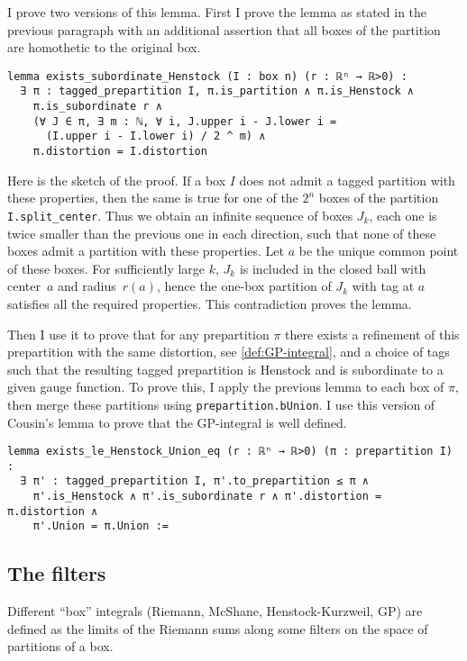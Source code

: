 \documentclass[a4paper, UKenglish,cleveref, autoref, thm-restate]{lipics-v2021}
\begin{document}
I prove two versions of this lemma. First I prove the lemma as stated
in the previous paragraph with an additional assertion that all boxes
of the partition are homothetic to the original box.

\begin{lstlisting}
lemma exists_subordinate_Henstock (I : box n) (r : ℝⁿ → ℝ>0) :
  ∃ π : tagged_prepartition I, π.is_partition ∧ π.is_Henstock ∧
    π.is_subordinate r ∧
    (∀ J ∈ π, ∃ m : ℕ, ∀ i, J.upper i - J.lower i =
      (I.upper i - I.lower i) / 2 ^ m) ∧
    π.distortion = I.distortion
\end{lstlisting}

Here is the sketch of the proof. If a box \(I\) does not admit a
tagged partition with these properties, then the same is true for one
of the \(2^{n}\) boxes of the partition
\lstinline=I.split_center=. Thus we obtain an infinite sequence of
boxes \(J_{k}\), each one is twice smaller than the previous one in
each direction, such that none of these boxes admit a partition with
these properties. Let \(a\) be the unique common point of these
boxes. For sufficiently large \(k\), \(J_{k}\) is included in the
closed ball with center~\(a\) and radius~\(r(a)\), hence the one-box
partition of \(J_{k}\) with tag at \(a\) satisfies all the required
properties. This contradiction proves the lemma.

Then I use it to prove that for any prepartition \(\pi\) there exists
a refinement of this prepartition with the same distortion, see
\autoref{def:GP-integral}, and a choice of tags such that the
resulting tagged prepartition is Henstock and is subordinate to a
given gauge function. To prove this, I apply the previous lemma to
each box of \(\pi\), then merge these partitions using
\lstinline=prepartition.bUnion=. I use this version of Cousin's lemma
to prove that the GP-integral is well defined.

\begin{lstlisting}
lemma exists_le_Henstock_Union_eq (r : ℝⁿ → ℝ>0) (π : prepartition I) :
  ∃ π' : tagged_prepartition I, π'.to_prepartition ≤ π ∧
    π'.is_Henstock ∧ π'.is_subordinate r ∧ π'.distortion = π.distortion ∧
    π'.Union = π.Union :=
\end{lstlisting}

\subsection{The filters}\label{sec:filters}

Different “box” integrals (Riemann, McShane, Henstock-Kurzweil, GP)
are defined as the limits of the Riemann sums along some filters on
the space of partitions of a box.
\end{document}

